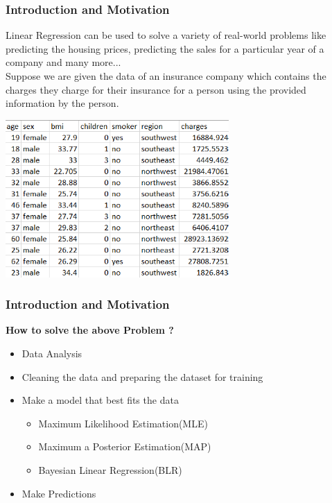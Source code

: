 \documentclass[handout,9pt]{beamer}
\numberwithin{theorem}{section}
\begin{document}
\begin{frame}
	\begin{spacing}{1}
	\frametitle{Introduction and Motivation}
	Linear Regression can be used to solve a variety of real-world problems like predicting the housing prices, predicting the sales for a particular year of a company and many more...\\ \pause
	Suppose we are given the data of an insurance company which contains the charges they charge for their insurance for a person using the provided information by the person.\\
	\begin{center}
		\includegraphics[height=6cm]{slide2}
	\end{center}
\end{spacing}
\end{frame}

\begin{frame}
	\begin{spacing}{1}
	\frametitle{Introduction and Motivation}
	\textbf{How to solve the above Problem ?}\\\pause
	\begin{itemize}
		\item Data Analysis\\\pause
		\item Cleaning the data and preparing the dataset for training\\\pause
		\item Make a model that best fits the data\\ \pause
		 	\begin{itemize}
		 		\item Maximum Likelihood Estimation(MLE)\\
		 		\item Maximum a Posterior Estimation(MAP)\\
		 		\item Bayesian Linear Regression(BLR)\pause
		 	\end{itemize}
	 	\item Make Predictions
	\end{itemize}
	\end{spacing}
\end{frame}
\end{document}
